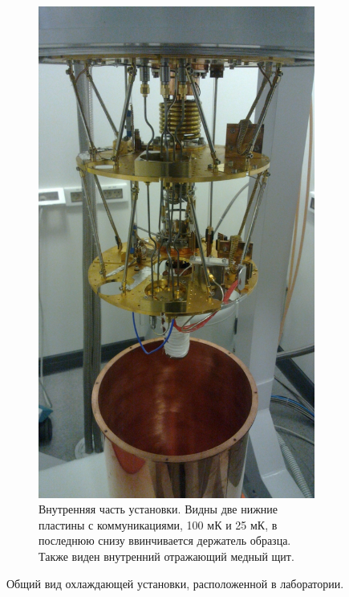 \documentclass[12pt, twoside]{report}
\numberwithin{equation}{section}
\numberwithin{figure}{section}
\begin{document}
\begin{figure}
\begin{subfigure}[t]{0.45\textwidth}
\end{subfigure}
\begin{subfigure}[t]{0.45\textwidth}
\centering
\includegraphics[height=0.4\textheight]{Pictures/cryo_inside}
\caption{Внутренняя часть установки. Видны две нижние пластины с коммуникациями, 100 мК и 25 мК, в последнюю снизу ввинчивается держатель образца. Также виден внутренний отражающий медный щит.}
\end{subfigure}
\endgroup
\caption{Общий вид охлаждающей установки, расположенной в лаборатории.}
\label{fig:fridge}
\end{figure}
\end{document}
